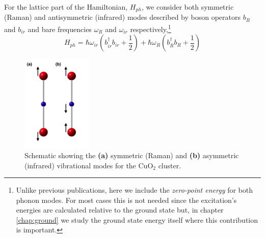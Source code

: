 For the lattice  part of the Hamiltonian, $H_{ph}$, we consider both symmetric (Raman) and antisymmetric (infrared) modes described by boson operators $b_R$ and $b_{ir}$ and bare frequencies $\omega_R$ and $\omega_{ir}$ respectively,\footnote{Unlike previous publications, here we include the \textit{zero-point energy} for both phonon modes. 
For most cases this is not needed since the excitation's energies are calculated relative to the ground state but, in chapter \ref{chap:ground} we study the ground state energy itself where this contribution is important.}
%
\begin{equation}
 \label{eq:phonon-part}
 H_{ph} = \hbar \omega_{ir}\left(b_{ir}^\dagger b_{ir}+\frac{1}{2}\right) + \hbar \omega_R \left( b_R^\dagger b_R + \frac{1}{2}\right)
\end{equation}
%
\begin{figure}[ht!]
  \centering
  \includegraphics[width=0.3\textwidth]{images/CuO2-vibrations.png}
  \caption{Schematic showing the \textbf{(a)} symmetric (Raman) and \textbf{(b)} asymmetric (infrared) vibrational modes for the CuO$_2$ cluster.}
  \label{fig:CO2-vibrations}
\end{figure}

